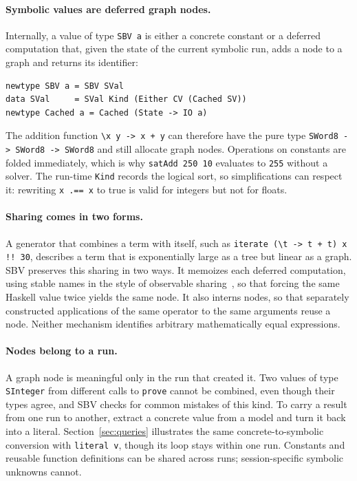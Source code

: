 \documentclass[review]{jfp-epi}
\newcommand{\code}[1]{\texttt{#1}}
\begin{document}
\paragraph{Symbolic values are deferred graph nodes.}
Internally, a value of type \code{SBV a} is either a concrete constant or a
deferred computation that, given the state of the current symbolic run, adds a
node to a graph and returns its identifier:
\begin{lstlisting}
newtype SBV a = SBV SVal
data SVal     = SVal Kind (Either CV (Cached SV))
newtype Cached a = Cached (State -> IO a)
\end{lstlisting}
The addition function \code{\textbackslash{}x y -> x + y} can therefore have
the pure type \code{SWord8 -> SWord8 -> SWord8} and still allocate graph nodes. Operations
on constants are folded immediately, which is why \code{satAdd 250 10} evaluates
to \code{255} without a solver. The run-time \code{Kind} records the logical sort,
so simplifications can respect it: rewriting \code{x .== x} to true is valid for
integers but not for floats.

\paragraph{Sharing comes in two forms.}
A generator that combines a term with itself, such as
\code{iterate (\textbackslash{}t -> t + t) x !! 30}, describes a term that is
exponentially large as a tree but linear as a graph. SBV preserves this sharing
in two ways. It memoizes each deferred computation, using stable names in the
style of observable sharing~\citep{sharing}, so that forcing the same Haskell
value twice yields the same node. It also interns nodes, so that separately
constructed applications of the same operator to the same arguments reuse a node.
Neither mechanism identifies arbitrary mathematically equal expressions.

\paragraph{Nodes belong to a run.}
A graph node is meaningful only in the run that created it. Two values of type
\code{SInteger} from different calls to \code{prove} cannot be combined, even
though their types agree, and SBV checks for common mistakes of this kind. To
carry a result from one run to another, extract a concrete value from a model
and turn it back into a literal. Section~\ref{sec:queries} illustrates the same
concrete-to-symbolic conversion with \code{literal v}, though its loop stays
within one run. Constants and reusable function definitions can be shared
across runs; session-specific symbolic unknowns cannot.
\end{document}
